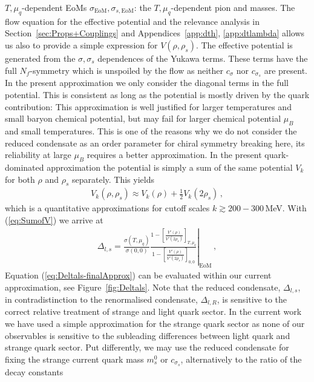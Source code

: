 \documentclass[%
reprint,
superscriptaddress,
showpacs,preprintnumbers,
 amsmath,amssymb,
 aps,
prd,
]{revtex4-1}
\def\Fig#1{Figure~\ref{#1}}
\def\Eq#1{Equation (\ref{#1})}
\def\eq#1{(\ref{#1})}
\def\sec#1{Section~\ref{#1}}
\begin{document}
$T,\mu_q$-dependent EoMs $\sigma_\textrm{EoM},\sigma_{s,\textrm{EoM}}$:
the $T,\mu_q$-dependent pion and 
masses. The flow equation for the effective potential and the
relevance analysis in \sec{sec:Props+Couplings} and
Appendices~\ref{app:dth}, \ref{app:dtlambda} allows us also to provide
a simple expression for $V(\rho,\rho_s)$. The effective potential is
generated from the $\sigma, \sigma_s$ dependences of the Yukawa terms.
These terms have the full $N_f$-symmetry which is unspoiled by the
flow as neither $c_\sigma$ nor $c_{\sigma_s}$ are present. In the
present approximation we only consider the diagonal terms in the full
potential.  This is consistent as long as the potential is mostly
driven by the quark contribution: This approximation is well justified
for larger temperatures and small baryon chemical potential, but may
fail for larger chemical potential $\mu_B$ and small temperatures.
This is one of the reasons why we do not consider the reduced
condensate as an order parameter for chiral symmetry breaking here, its
reliability at large $\mu_B$ requires a better approximation. In the
present quark-dominated approximation the potential is simply a sum of
the same potential $V_k$ for both $\rho$ and $\rho_s$ separately. This
yields
%
\begin{align}\label{eq:SumofV}
  V_k(\rho,\rho_s) \approx    V_k(\rho) + \frac12 V_k(2 \rho_s)\,, 
\end{align}
%
which is a quantitative approximations for cutoff scales
$k\gtrsim 200-300\,$MeV. With \eq{eq:SumofV} we arrive at
%
\begin{align}\label{eq:Deltals-finalApprox}
  \Delta_{l,s} =\left. \frac{ \sigma(T,\mu_q)}{
  \sigma(0,0)} \frac{  1
  -  \left[\frac{ V'(\rho) }{
  V'(2\rho_{s}) }\right]_{T,\mu_q}}
  {1 - \left[  \frac{ V'(\rho) }{
  V'(2\rho_{s}) }\right]_{0,0}}\right|_{\textrm{EoM}}\,,
\end{align}
%
\Eq{eq:Deltals-finalApprox} can be evaluated within our current
approximation, see \Fig{fig:Deltals}. Note that the reduced
condensate, $\Delta_{l,s}$, in contradistinction to the renormalised
condensate, $\Delta_{l,R}$, is sensitive to the correct relative
treatment of strange and light quark sector. In the current work we
have used a simple approximation for the strange quark sector as none
of our observables is sensitive to the subleading differences between
light quark and strange quark sector. Put differently, we may use the
reduced condensate for fixing the strange current quark mass $m_s^0$
or $c_{\sigma_s}$, alternatively to the ratio of the decay constants
\end{document}
